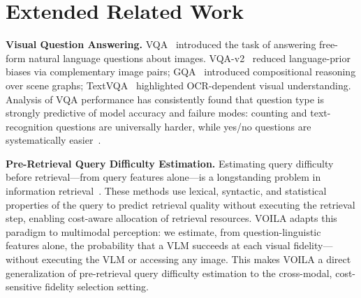 
\section{Extended Related Work}\label{sec:related_ext}

\noindent\textbf{Visual Question Answering.}
VQA~\cite{antol2015vqa} introduced the task of answering free-form natural language questions about images.
VQA-v2~\cite{goyal2017vqav2} reduced language-prior biases via complementary image pairs; GQA~\cite{hudson2019gqa} introduced compositional reasoning over scene graphs; TextVQA~\cite{singh2019textvqa} highlighted OCR-dependent visual understanding.
Analysis of VQA performance has consistently found that question type is strongly predictive of model accuracy and failure modes: counting and text-recognition questions are universally harder, while yes/no questions are systematically easier~\cite{kafle2017analysis, agrawal2018dont}.

\noindent\textbf{Pre-Retrieval Query Difficulty Estimation.}
Estimating query difficulty before retrieval---from query features alone---is a longstanding problem in information retrieval~\cite{zhao2008predicting, hauff2008improved, mothe2005linguistic}.
These methods use lexical, syntactic, and statistical properties of the query to predict retrieval quality without executing the retrieval step, enabling cost-aware allocation of retrieval resources.
VOILA adapts this paradigm to multimodal perception: we estimate, from question-linguistic features alone, the probability that a VLM succeeds at each visual fidelity---without executing the VLM or accessing any image.
This makes VOILA a direct generalization of pre-retrieval query difficulty estimation to the cross-modal, cost-sensitive fidelity selection setting.

